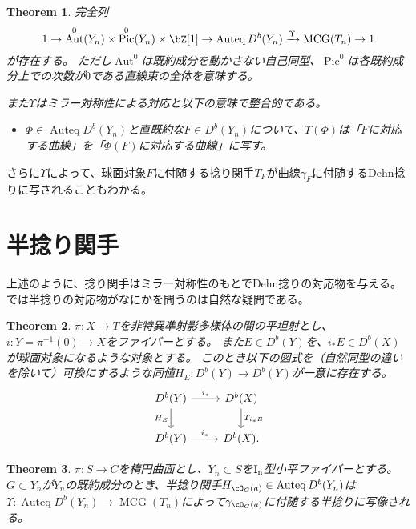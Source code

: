 \documentclass[uplatex,a4paper,dvipdfmx]{jsarticle}
\theoremstyle{plain}
\newtheorem{theorem}{Theorem}[section]
\theoremstyle{definition}
\DeclareMathOperator{\Auteq}{\mathrm{Auteq}}
\DeclareMathOperator{\Pic}{\mathrm{Pic}}
\DeclareMathOperator{\MCG}{\mathrm{MCG}}
\DeclareMathOperator{\Aut}{\mathrm{Aut}}
\begin{document}
\begin{theorem}\cite[Theorem D]{2020arXiv201108288O}
	完全列
	\begin{equation}
		1 \to \Aut^0(Y_n) \times \Pic^0(Y_n)\times \bZ[1] \to \Auteq{D^b(Y_n)} \xrightarrow{\Upsilon} \MCG(T_n) \to 1
	\end{equation}
	が存在する。
	ただし$\Aut^0$は既約成分を動かさない自己同型、$\Pic^0$は各既約成分上での次数が$0$である直線束の全体を意味する。

	また$\Upsilon$はミラー対称性による対応と以下の意味で整合的である。
	\begin{itemize}
		\item $\Phi \in \Auteq{D^b(Y_n)}$と直既約な$F \in D^b(Y_n)$について、$\Upsilon(\Phi)$は「$F$に対応する曲線」を「$\Phi(F)$に対応する曲線」に写す。
	\end{itemize}
\end{theorem}
さらに$\Upsilon$によって、球面対象$F$に付随する捻り関手$T_F$が曲線$\gamma_F$に付随するDehn捻りに写されることもわかる。
\section{半捻り関手}
上述のように、捻り関手はミラー対称性のもとでDehn捻りの対応物を与える。
では半捻りの対応物がなにかを問うのは自然な疑問である。
\begin{theorem}
	$\pi \colon X \to T$を非特異凖射影多様体の間の平坦射とし、$i \colon Y = \pi^{-1}(0) \to X$をファイバーとする。
	また$E \in D^b(Y)$を、$i_*E \in D^b(X)$が球面対象になるような対象とする。
	このとき以下の図式を（自然同型の違いを除いて）可換にするような同値$H_E \colon D^b(Y) \to D^b(Y)$が一意に存在する。
	\begin{equation}
		\begin{tikzcd}
			D^b(Y) \arrow[r,"i_*"]\arrow[d, "H_E"'] & D^b(X) \arrow[d,"T_{i_*E}"]\\
			D^b(Y) \arrow[r, "i_*"]& D^b(X).
		\end{tikzcd}
	\end{equation}
\end{theorem}

\begin{theorem}
	$\pi \colon S \to C$を楕円曲面とし、$Y_n \subset S$を$\rm{I}_n$型小平ファイバーとする。
	$G \subset Y_n$が$Y_n$の既約成分のとき、半捻り関手$H_{\cO_G(a)} \in \Auteq D^b(Y_n)$は$\Upsilon \colon \Auteq D^b(Y_n) \to \MCG(T_n)$によって$\gamma_{\cO_G(a)}$に付随する半捻りに写像される。
\end{theorem}
\end{document}

